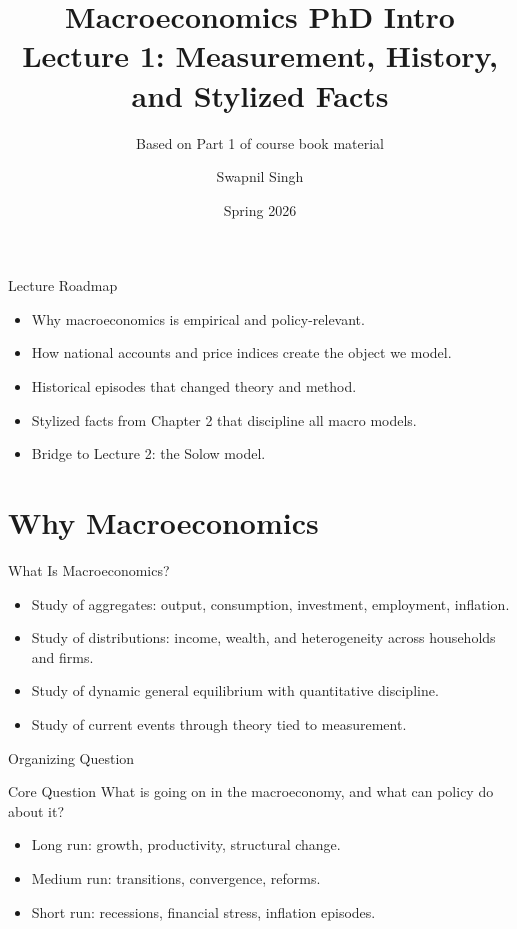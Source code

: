 \documentclass[aspectratio=169,10pt]{beamer}
\title{Macroeconomics PhD Intro\\Lecture 1: Measurement, History, and Stylized Facts}
\subtitle{Based on Part 1 of course book material}
\author{Swapnil Singh}
\institute{Lietuvos Bankas \and Kaunas University of Technology}
\date{Spring 2026}
\begin{document}
\begin{frame}
  \titlepage
\end{frame}

\begin{frame}{Lecture Roadmap}
\begin{itemize}
  \item Why macroeconomics is empirical and policy-relevant.
  \item How national accounts and price indices create the object we model.
  \item Historical episodes that changed theory and method.
  \item Stylized facts from Chapter 2 that discipline all macro models.
  \item Bridge to Lecture 2: the Solow model.
\end{itemize}
\end{frame}

\section{Why Macroeconomics}

\begin{frame}{What Is Macroeconomics?}
\begin{itemize}
  \item Study of aggregates: output, consumption, investment, employment, inflation.
  \item Study of distributions: income, wealth, and heterogeneity across households and firms.
  \item Study of dynamic general equilibrium with quantitative discipline.
  \item Study of current events through theory tied to measurement.
\end{itemize}
\end{frame}

\begin{frame}{Organizing Question}
\begin{block}{Core Question}
What is going on in the macroeconomy, and what can policy do about it?
\end{block}
\vspace{0.8em}
\begin{itemize}
  \item Long run: growth, productivity, structural change.
  \item Medium run: transitions, convergence, reforms.
  \item Short run: recessions, financial stress, inflation episodes.
\end{itemize}
\end{frame}
\end{document}
